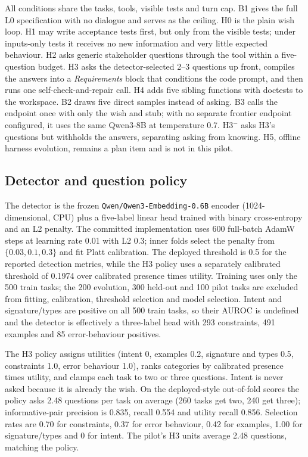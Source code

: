 \documentclass{article}
\begin{document}
All conditions share the tasks, tools, visible tests and turn cap. B1 gives the full L0
specification with no dialogue and serves as the ceiling. H0 is the plain wish loop. H1 may
write acceptance tests first, but only from the visible tests; under inputs-only tests it
receives no new information and very little expected behaviour. H2 asks generic stakeholder
questions through the tool within a five-question budget. H3 asks the detector-selected 2--3
questions up front, compiles the answers into a \emph{Requirements} block that conditions the
code prompt, and then runs one self-check-and-repair call. H4 adds five sibling functions with
doctests to the workspace. B2 draws five direct samples instead of asking. B3 calls the
endpoint once with only the wish and stub; with no separate frontier endpoint configured, it
uses the same Qwen3-8B at temperature 0.7. H3$^-$ asks H3's questions but withholds the
answers, separating asking from knowing. H5, offline harness evolution, remains a plan item
and is not in this pilot.

\subsection{Detector and question policy}

The detector is the frozen \texttt{Qwen/Qwen3-Embedding-0.6B} encoder (1024-dimensional, CPU)
plus a five-label linear head trained with binary cross-entropy and an L2 penalty. The
committed implementation uses 600 full-batch AdamW steps at learning rate 0.01 with L2 0.3;
inner folds select the penalty from $\{0.03, 0.1, 0.3\}$ and fit Platt calibration. The
deployed threshold is 0.5 for the reported detection metrics, while the H3 policy uses a
separately calibrated threshold of 0.1974 over calibrated presence times utility. Training
uses only the 500 train tasks; the 200 evolution, 300 held-out and 100 pilot tasks are
excluded from fitting, calibration, threshold selection and model selection. Intent and
signature/types are positive on all 500 train tasks, so their AUROC is undefined and the
detector is effectively a three-label head with 293 constraints, 491 examples and 85
error-behaviour positives.

The H3 policy assigns utilities (intent 0, examples 0.2, signature and types 0.5, constraints
1.0, error behaviour 1.0), ranks categories by calibrated presence times utility, and clamps
each task to two or three questions. Intent is never asked because it is already the wish. On
the deployed-style out-of-fold scores the policy asks 2.48 questions per task on average (260
tasks get two, 240 get three); informative-pair precision is 0.835, recall 0.554 and utility
recall 0.856. Selection rates are 0.70 for constraints, 0.37 for error behaviour, 0.42 for
examples, 1.00 for signature/types and 0 for intent. The pilot's H3 units average 2.48
questions, matching the policy.
\end{document}
